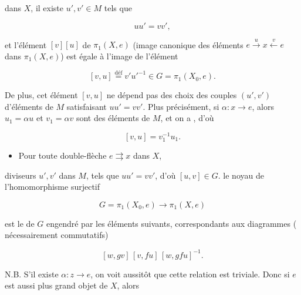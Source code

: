 \documentclass[11pt,a4paper]{article}
\begin{document}

dans $X$, il existe $u', v' \in M$ tels que

\[
  uu' = vv',
\]

et l'élément $[v][u]$ de $\pi_{1}(X,e)$ (image canonique des éléments
$e \xrightarrow{\ u\ } x \xleftarrow{\ v\ } e$ dans $\pi_{1}(X,e)$) est égale à
l'image de l'élément

\[
  [v,u] \overset{\text{déf}}{=} v'u'^{-1} \in G = \pi_{1}(X_{0}, e).
\]

De plus,  cet élément $[v,u]$ ne
dépend pas des choix des couples $(u',v')$ \struck{\ill{}} d'éléments de $M$
satisfaisant $uu' = vv'$. Plus précisément, si $\alpha : x \longrightarrow e$,
alors $u_{1} = \alpha u$ et $v_{1} = \alpha v$ sont des éléments de $M$, et on a
, d'où

\[
  [v,u] = v_{1}^{-1} u_{1} .
\]

\begin{itemize}
\item[c)] Pour toute double-flèche $e \rightrightarrows x$ dans $X$, \ill{}
\end{itemize}


\ill{} diviseurs $u', v'$ dans $M$, tels que $uu' = vv'$, d'où
$[u,v] \in G$.  le noyau de l'homomorphisme surjectif

\[
  G = \pi_{1}(X_{0}, e) \longrightarrow \pi_{1}(X, e)
\]

est le  de $G$ engendré par les éléments
suivants, correspondants aux diagrammes (
nécessairement commutatifs)


\[
  [w, gv]\,[v, fu]\,[w, gfu]^{-1} .
\]


N.B. S'il existe $\alpha : z \longrightarrow e$, on voit aussitôt que cette
relation est triviale. Donc si $e$ est aussi plus grand objet de $X$, alors
\end{document}
